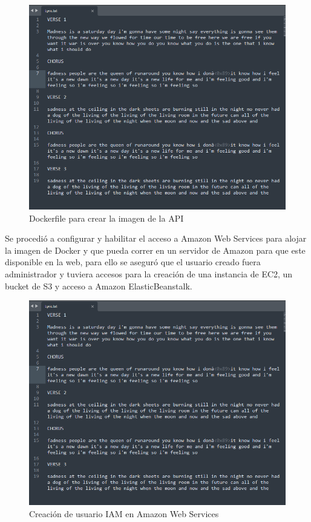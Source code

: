 \documentclass[12pt, a4paper, titlepage]{report}
\begin{document}
\begin{figure}[H]
	\includegraphics[width=12cm]{./imagenes/Desarrollo/AplicacionWeb/Archivo.png}
	\centering 
	\caption{Dockerfile para crear la imagen de la API}
\end{figure}

Se procedió a configurar y habilitar el acceso a Amazon Web Services para alojar la imagen de Docker y que pueda correr en un servidor de Amazon para que este disponible en la web, para ello se aseguró que el usuario creado fuera administrador y tuviera accesos para la creación de una instancia de EC2, un bucket de S3 y acceso a Amazon ElasticBeanstalk.

\begin{figure}[H]
	\includegraphics[width=12cm]{./imagenes/Desarrollo/AplicacionWeb/Archivo.png}
	\centering 
	\caption{Creación de usuario IAM en Amazon Web Services}
\end{figure}
\end{document}
